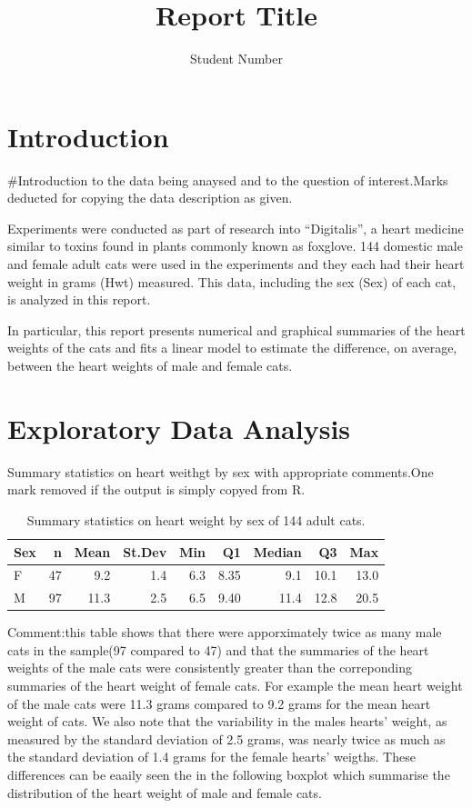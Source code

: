 \documentclass[
]{article}
\title{Report Title}
\author{Student Number}
\date{}
\begin{document}
\maketitle

\hypertarget{sec:Intro}{%
\section{Introduction}\label{sec:Intro}}

\#Introduction to the data being anaysed and to the question of
interest.Marks deducted for copying the data description as given.

Experiments were conducted as part of research into ``Digitalis'', a
heart medicine similar to toxins found in plants commonly known as
foxglove. 144 domestic male and female adult cats were used in the
experiments and they each had their heart weight in grams (Hwt)
measured. This data, including the sex (Sex) of each cat, is analyzed in
this report.

In particular, this report presents numerical and graphical summaries of
the heart weights of the cats and fits a linear model to estimate the
difference, on average, between the heart weights of male and female
cats.

\hypertarget{sec:EDA}{%
\section{Exploratory Data Analysis}\label{sec:EDA}}

Summary statistics on heart weithgt by sex with appropriate comments.One
mark removed if the output is simply copyed from R.

\begin{table}[!h]

\caption{\label{tab:unnamed-chunk-1}\label{tab:summaries} Summary statistics on
  heart weight by sex of 144 adult cats.}
\centering
\begin{tabular}[t]{l|r|r|r|r|r|r|r|r}
\hline
Sex & n & Mean & St.Dev & Min & Q1 & Median & Q3 & Max\\
\hline
F & 47 & 9.2 & 1.4 & 6.3 & 8.35 & 9.1 & 10.1 & 13.0\\
\hline
M & 97 & 11.3 & 2.5 & 6.5 & 9.40 & 11.4 & 12.8 & 20.5\\
\hline
\end{tabular}
\end{table}

Comment:this table shows that there were apporximately twice as many
male cats in the sample(97 compared to 47) and that the summaries of the
heart weights of the male cats were consistently greater than the
correponding summaries of the heart weight of female cats. For example
the mean heart weight of the male cats were 11.3 grams compared to 9.2
grams for the mean heart weight of cats. We also note that the
variability in the males hearts' weight, as measured by the standard
deviation of 2.5 grams, was nearly twice as much as the standard
deviation of 1.4 grams for the female hearts' weigths. These differences
can be eaaily seen the in the following boxplot which summarise the
distribution of the heart weight of male and female cats.
\end{document}
